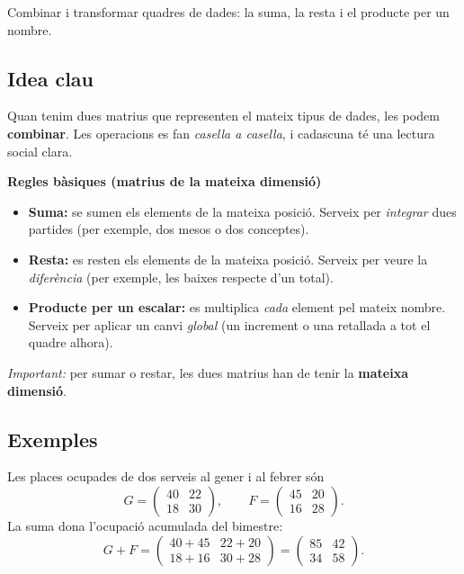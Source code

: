 %
{Combinar i transformar quadres de dades: la suma, la resta i el producte per un nombre.}

\subsection{Idea clau}

Quan tenim dues matrius que representen el mateix tipus de dades, les podem
\textbf{combinar}. Les operacions es fan \emph{casella a casella}, i cadascuna té
una lectura social clara.

\begin{idea}
\textbf{Regles bàsiques (matrius de la mateixa dimensió)}
\begin{itemize}[leftmargin=1.4em, itemsep=2pt]
  \item \textbf{Suma:} se sumen els elements de la mateixa posició. Serveix per
        \emph{integrar} dues partides (per exemple, dos mesos o dos conceptes).
  \item \textbf{Resta:} es resten els elements de la mateixa posició. Serveix per
        veure la \emph{diferència} (per exemple, les baixes respecte d'un total).
  \item \textbf{Producte per un escalar:} es multiplica \emph{cada} element pel
        mateix nombre. Serveix per aplicar un canvi \emph{global} (un increment
        o una retallada a tot el quadre alhora).
\end{itemize}
\textit{Important:} per sumar o restar, les dues matrius han de tenir la
\textbf{mateixa dimensió}.
\end{idea}

\subsection{Exemples}

\begin{exemple}
Les places ocupades de dos serveis al gener i al febrer són
\[
G=\begin{pmatrix} 40 & 22 \\ 18 & 30 \end{pmatrix},\qquad
F=\begin{pmatrix} 45 & 20 \\ 16 & 28 \end{pmatrix}.
\]
La suma dona l'ocupació acumulada del bimestre:
\[
G+F=\begin{pmatrix} 40+45 & 22+20 \\ 18+16 & 30+28 \end{pmatrix}
    =\begin{pmatrix} 85 & 42 \\ 34 & 58 \end{pmatrix}.
\]
\end{exemple}

